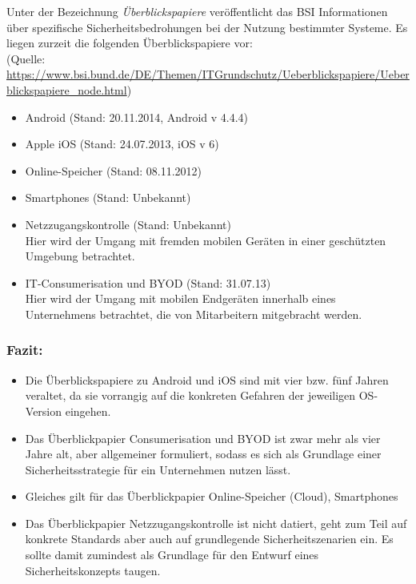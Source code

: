Unter der Bezeichnung \emph{Überblickspapiere} veröffentlicht das BSI Informationen über spezifische Sicherheitsbedrohungen bei der Nutzung bestimmter Systeme. Es liegen zurzeit die folgenden Überblickspapiere vor:\\
(Quelle: \url{https://www.bsi.bund.de/DE/Themen/ITGrundschutz/Ueberblickspapiere/Ueberblickspapiere_node.html})

\begin{itemize}
	\item Android (Stand: 20.11.2014, Android v 4.4.4)
	\item Apple iOS (Stand: 24.07.2013, iOS v 6)
	\item Online-Speicher (Stand: 08.11.2012)
	\item Smartphones (Stand: Unbekannt)
	\item Netzzugangskontrolle (Stand: Unbekannt)\\
	Hier wird der Umgang mit fremden mobilen Geräten in einer geschützten Umgebung betrachtet.
	\item IT-Consumerisation und BYOD (Stand: 31.07.13)\\
	Hier wird der Umgang mit mobilen Endgeräten innerhalb eines Unternehmens betrachtet, die von Mitarbeitern mitgebracht werden.
\end{itemize}

\subsubsection{Fazit:}

\begin{itemize}
	\item Die Überblickspapiere zu Android und iOS sind mit vier bzw. fünf Jahren veraltet, da sie vorrangig auf die konkreten Gefahren der jeweiligen OS-Version eingehen.
	\item Das Überblickpapier Consumerisation und BYOD ist zwar mehr als vier Jahre alt, aber allgemeiner formuliert, sodass es sich als Grundlage einer Sicherheitsstrategie für ein Unternehmen nutzen lässt.
	\item Gleiches gilt für das Überblickpapier Online-Speicher (Cloud), Smartphones
	\item Das Überblickpapier Netzzugangskontrolle ist nicht datiert, geht zum Teil auf konkrete Standards aber auch auf grundlegende Sicherheitszenarien ein. Es sollte damit zumindest als Grundlage für den Entwurf eines Sicherheitskonzepts taugen.
\end{itemize}


